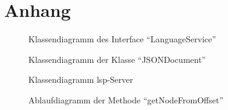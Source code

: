 \chapter{Anhang}\label{ch:appendix}

\begin{figure}[htp] %
    \centering
    \caption{Klassendiagramm des Interface ``LanguageService''}
    \label{fig:language-service-interface-defition}
\end{figure}

\vspace{0.5cm}

\begin{figure}[htp] %
    \centering
    \caption{Klassendiagramm der Klasse ``JSONDocument''}
    \label{fig:class-diagram-json-document}
\end{figure}

\begin{figure}[htp] %
    \centering
    \caption{Klassendiagramm \acs{lsp}-Server}
    \label{fig:class-diagram-lsp-Server}
\end{figure}

\begin{figure}[htp] %
    \centering
    \caption{Ablaufdiagramm der Methode ``getNodeFromOffset''}
    \label{fig:flowchart-get-node-from-offset}
\end{figure}





